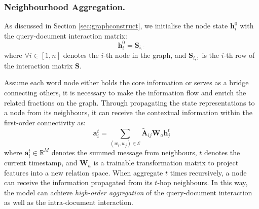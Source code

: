 \subsubsection{Neighbourhood Aggregation.}
As discussed in Section \ref{sec:graphconstruct}, we initialise the node state $\mathbf{h}^0_i$ with the query-document interaction matrix:
\begin{equation}\mathbf{h}^0_i =  \mathbf{S}_{i,:}
\end{equation}
where $\forall i\in [1, n]$ denotes the $i$-th node in the graph, and $\mathbf{S}_{i,:}$ is the $i$-th row of the interaction matrix $\mathbf{S}$.

Assume each word node either holds the core information or serves as a bridge connecting others, it is necessary to make the information flow and enrich the related fractions on the graph.
Through propagating the state representations to a node from its neighbours, it can receive the contextual information within the first-order connectivity as:
\begin{equation}\mathbf{a}_{i}^{t}=\sum_{(w_{i}, w_{j}) \in \mathcal{E}} \mathbf{\tilde{A}}_{ij} \mathbf{W}_{a} \mathbf{h}_{j}^{t}\end{equation}
where $\mathbf{a}_i^t \in \mathbb{R}^{M}$ denotes the summed message from neighbours, $t$ denotes the current timestamp, and $\mathbf{W}_a$ is a trainable transformation matrix to project features into a new relation space. When aggregate $t$ times recursively, a node can receive the information propagated from its $t$-hop neighbours. In this way, the model can achieve \emph{high-order aggregation} of the query-document interaction as well as the intra-document interaction.

